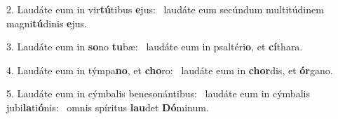 2. Laudáte eum in vir\textbf{tú}tibus \textbf{e}jus: \ast\  laudáte eum secúndum multitúdinem magni\textbf{tú}dinis \textbf{e}jus.\

3. Laudáte eum in \textbf{so}no \textbf{tu}bæ: \ast\  laudáte eum in psaltéri\textbf{o}, et \textbf{cí}thara.\

4. Laudáte eum in týmpa\textbf{no}, et \textbf{cho}ro: \ast\  laudáte eum in \textbf{chor}dis, et \textbf{ór}gano.\

5. Laudáte eum in cýmbalis benesonántibus: \dag\  laudáte eum in cýmbalis jubi\textbf{la}ti\textbf{ó}nis: \ast\  omnis spíritus \textbf{lau}det \textbf{Dó}minum.\

